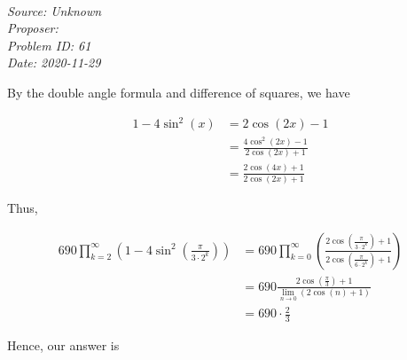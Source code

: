 \SSbreak\\       
\emph{Source: Unknown}\\
\emph{Proposer: \Pchan}\\
\emph{Problem ID: 61}\\
\emph{Date: 2020-11-29}\\
\SSbreak

\bigskip

\begin{solution}\hfil\medskip 

    By the double angle formula and difference of squares, we have 

    \begin{align*}
        1-4\sin^2(x)&= 2\cos(2x) -1 \\
        &= \frac{4\cos^2(2x)-1}{2\cos(2x)+1} \\
        &= \frac{2\cos(4x) +1}{2\cos(2x)+1}    
    \end{align*}
 
    Thus, 

    \begin{align*}
        690\prod_{k=2}^{\infty} \left(1-4\sin^2\left(\frac{\pi}{3\cdot2^k}\right)\right)&=
        690\prod_{k=0}^{\infty} \left(\frac{2\cos\left(\frac{\pi}{3\cdot2^k}\right) +1}{2\cos\left(\frac{\pi}{6\cdot2^k}\right)+1}\right)\\
        &=690\frac{2\cos\left(\frac{\pi}{3}\right)+1}{\displaystyle \lim_{n\to 0} \left(2\cos(n) +1\right)}\\
        &= 690\cdot\frac{2}{3}
    \end{align*}

    Hence, our answer is 
\end{solution}